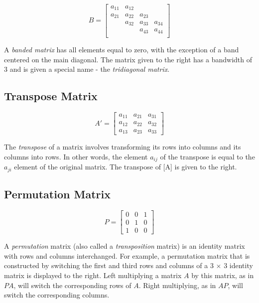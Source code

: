 \documentclass[book.tex]{subfiles}
\begin{document}
\begin{margintable}
	\[
	B=
	\begin{bmatrix}
	a_{11} & a_{12} & &  \\
	a_{21} & a_{22} & a_{23} & \\
	& a_{32} & a_{33} & a_{34} \\
	&  & a_{43} & a_{44} \\
	\end{bmatrix}
	\]
\end{margintable}

A \textit{banded matrix} has all elements equal to zero, with the exception of a band centered on the main diagonal. The matrix given to the right has a bandwidth of 3 and is given a special name - the \textit{tridiagonal matrix}.

\subsection{Transpose Matrix}
\begin{margintable}
	\[
	A'=
	\begin{bmatrix}
	a_{11} & a_{21} & a_{31} \\
	a_{12} & a_{22} & a_{32} \\
	a_{13} & a_{23} & a_{33}
	\end{bmatrix}
	\]
\end{margintable}

The \textit{transpose} of a matrix involves transforming its rows into columns and its columns into rows. In other words, the element $a_{ij}$ of the transpose is equal to the $a_{ji}$ element of the original matrix. The transpose of [A] is given to the right.

\subsection{Permutation Matrix}
\begin{margintable}
	\[
	P=
	\begin{bmatrix}
	0 & 0  & 1 \\
	0 & 1 & 0 \\
	1 & 0 & 0
	\end{bmatrix}
	\]
\end{margintable}

A \textit{permutation} matrix (also called a \textit{transposition} matrix) is an identity matrix with rows and columns interchanged. For example, a permutation matrix that is constructed by switching the first and third rows and columns of a 3 $\times$ 3 identity matrix is displayed to the right. Left multiplying a matrix $A$ by this matrix, as in $PA$, will switch the corresponding rows of $A$. Right multiplying, as in $AP$, will switch the corresponding columns.
\end{document}
